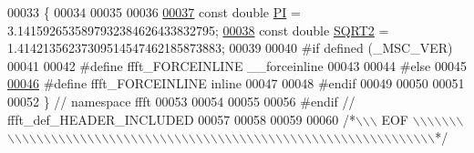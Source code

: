 \begin{DoxyCode}
00033 \{
00034 
00035 
00036 
\hypertarget{a00089_source_l00037}{}\hyperlink{a00142_a74ffcd4c90202b5240bbca7374dfd6fa}{00037} \textcolor{keyword}{const} \textcolor{keywordtype}{double}    \hyperlink{a00142_a74ffcd4c90202b5240bbca7374dfd6fa}{PI}        = 3.1415926535897932384626433832795;
\hypertarget{a00089_source_l00038}{}\hyperlink{a00142_a489004390ad7d791bf53a724c0f07abb}{00038} \textcolor{keyword}{const} \textcolor{keywordtype}{double}    \hyperlink{a00142_a489004390ad7d791bf53a724c0f07abb}{SQRT2}  = 1.41421356237309514547462185873883;
00039 
00040 \textcolor{preprocessor}{#if defined (\_MSC\_VER)}
00041 
00042 \textcolor{preprocessor}{    #define ffft\_FORCEINLINE    \_\_forceinline}
00043 
00044 \textcolor{preprocessor}{#else}
00045 
\hypertarget{a00089_source_l00046}{}\hyperlink{a00089_a31b2ada863c9efa7455efae4e13661f3}{00046} \textcolor{preprocessor}{    #define ffft\_FORCEINLINE    inline}
00047 
00048 \textcolor{preprocessor}{#endif}
00049 
00050 
00051 
00052 \}   \textcolor{comment}{// namespace ffft}
00053 
00054 
00055 
00056 \textcolor{preprocessor}{#endif  // ffft\_def\_HEADER\_INCLUDED}
00057 
00058 
00059 
00060 \textcolor{comment}{/*\(\backslash\)\(\backslash\)\(\backslash\) EOF \(\backslash\)\(\backslash\)\(\backslash\)\(\backslash\)\(\backslash\)\(\backslash\)\(\backslash\)\(\backslash\)\(\backslash\)\(\backslash\)\(\backslash\)\(\backslash\)\(\backslash\)\(\backslash\)\(\backslash\)\(\backslash\)\(\backslash\)\(\backslash\)\(\backslash\)\(\backslash\)\(\backslash\)\(\backslash\)\(\backslash\)\(\backslash\)\(\backslash\)\(\backslash\)\(\backslash\)\(\backslash\)\(\backslash\)\(\backslash\)\(\backslash\)\(\backslash\)\(\backslash\)\(\backslash\)\(\backslash\)\(\backslash\)\(\backslash\)\(\backslash\)\(\backslash\)\(\backslash\)\(\backslash\)\(\backslash\)\(\backslash\)\(\backslash\)\(\backslash\)\(\backslash\)\(\backslash\)\(\backslash\)\(\backslash\)\(\backslash\)\(\backslash\)\(\backslash\)\(\backslash\)\(\backslash\)\(\backslash\)\(\backslash\)\(\backslash\)\(\backslash\)\(\backslash\)\(\backslash\)\(\backslash\)\(\backslash\)\(\backslash\)\(\backslash\)\(\backslash\)\(\backslash\)*/}
\end{DoxyCode}
